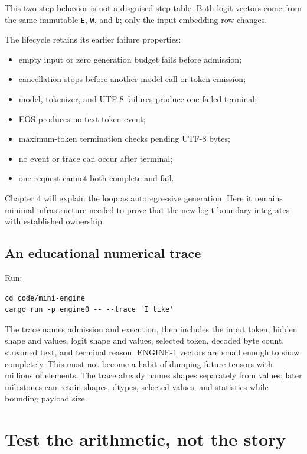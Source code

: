 This two-step behavior is not a disguised step table. Both logit vectors
come from the same immutable \texttt{E}, \texttt{W}, and \texttt{b};
only the input embedding row changes.

The lifecycle retains its earlier failure properties:

\begin{itemize}
\tightlist
\item
  empty input or zero generation budget fails before admission;
\item
  cancellation stops before another model call or token emission;
\item
  model, tokenizer, and UTF-8 failures produce one failed terminal;
\item
  EOS produces no text token event;
\item
  maximum-token termination checks pending UTF-8 bytes;
\item
  no event or trace can occur after terminal;
\item
  one request cannot both complete and fail.
\end{itemize}

Chapter 4 will explain the loop as autoregressive generation. Here it
remains minimal infrastructure needed to prove that the new logit
boundary integrates with established ownership.

\subsection{An educational numerical
trace}\label{an-educational-numerical-trace}

Run:

\begin{verbatim}
cd code/mini-engine
cargo run -p engine0 -- --trace 'I like'
\end{verbatim}

The trace names admission and execution, then includes the input token,
hidden shape and values, logit shape and values, selected token, decoded
byte count, streamed text, and terminal reason. ENGINE-1 vectors are
small enough to show completely. This must not become a habit of dumping
future tensors with millions of elements. The trace already names shapes
separately from values; later milestones can retain shapes, dtypes,
selected values, and statistics while bounding payload size.

\section{Test the arithmetic, not the
story}\label{test-the-arithmetic-not-the-story}

